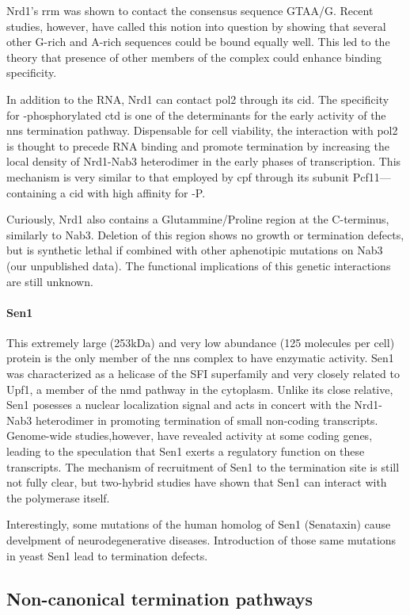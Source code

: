 Nrd1's \gls{rrm} was shown \invivo{} to contact the consensus sequence GTAA/G.
Recent \invitro{} studies, however, have called this notion into question by showing that several other G-rich and A-rich sequences could be bound equally well.
This led to the theory that presence of other members of the complex could enhance binding specificity.

In addition to the RNA, Nrd1 can contact \gls{pol2} through its \gls{cid}. 
The specificity for \serf{}-phosphorylated \gls{ctd} is one of the determinants for the early activity of the \gls{nns} termination pathway. 
Dispensable for cell viability, the interaction with \gls{pol2} is thought to precede RNA binding and promote termination by increasing the local density of Nrd1-Nab3 heterodimer in the early phases of transcription.
This mechanism is very similar to that employed by \gls{cpf} through its subunit Pcf11---containing a \gls{cid} with high affinity for \sert{}-P.
 
Curiously, Nrd1 also contains a Glutammine/Proline region at the C-terminus, similarly to Nab3. 
Deletion of this region shows no growth or termination defects, but is synthetic lethal if combined with other aphenotipic mutations on Nab3 (our unpublished data).
The functional implications of this genetic interactions are still unknown. 

\paragraph{Sen1}

This extremely large (253kDa) and very low abundance (125 molecules per cell) protein is the only member of the \gls{nns} complex to have enzymatic activity.
Sen1 was characterized as a helicase of the SFI superfamily and very closely related to Upf1, a member of the \gls{nmd} pathway in the cytoplasm.
Unlike its close relative, Sen1 posesses a nuclear localization signal and acts in concert with the Nrd1-Nab3 heterodimer in promoting termination of small non-coding transcripts.
Genome-wide studies,however, have revealed activity at some coding genes, leading to the speculation that Sen1 exerts a regulatory function on these transcripts. 
The mechanism of recruitment of Sen1 to the termination site is still not fully clear, but two-hybrid studies have shown that Sen1 can interact with the polymerase itself.

Interestingly, some mutations of the human homolog of Sen1 (Senataxin) cause develpment of neurodegenerative diseases. 
Introduction of those same mutations in yeast Sen1 lead to termination defects.

\subsection{Non-canonical termination pathways}